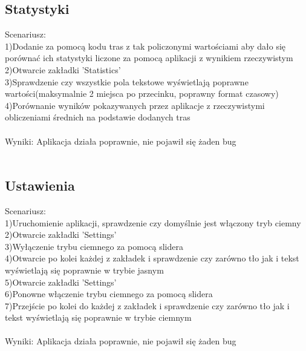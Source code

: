 \subsection{Statystyki} %
Scenariusz:\\
1)Dodanie za pomocą kodu tras z tak policzonymi wartościami aby dało się porównać ich statystyki liczone za pomocą aplikacji z wynikiem rzeczywistym\\
2)Otwarcie zakładki 'Statistics'\\
3)Sprawdzenie czy wszystkie pola tekstowe wyświetlają poprawne wartości(maksymalnie 2 miejsca po przecinku, poprawny format czasowy)\\
4)Porównanie wyników pokazywanych przez aplikacje z rzeczywistymi obliczeniami średnich na podstawie dodanych tras\\\\
Wyniki: Aplikacja działa poprawnie, nie pojawił się żaden bug\\\\

\newpage
\subsection{Ustawienia} %
Scenariusz:\\
1)Uruchomienie aplikacji, sprawdzenie czy domyślnie jest włączony tryb ciemny\\
2)Otwarcie zakładki 'Settings'\\
3)Wyłączenie trybu ciemnego za pomocą slidera\\
4)Otwarcie po kolei każdej z zakładek i sprawdzenie czy zarówno tło jak i tekst wyświetlają się poprawnie w trybie jasnym\\
5)Otwarcie zakładki 'Settings'\\
6)Ponowne włączenie trybu ciemnego za pomocą slidera\\
7)Przejście po kolei do każdej z zakładek i sprawdzenie czy zarówno tło jak i tekst wyświetlają się poprawnie w trybie ciemnym\\\\
Wyniki: Aplikacja działa poprawnie, nie pojawił się żaden bug\\\\

